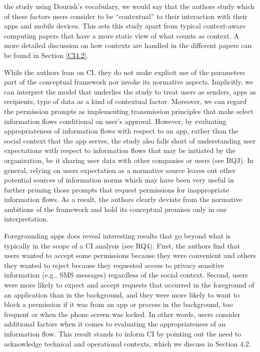 \documentclass[../thesis.tex]{subfiles}
\begin{document}
the study using Dourish's vocabulary, we would say that
the authors study which of these factors users consider to be
``contextual'' to their interaction
with their apps and mobile devices. This sets this study apart from
typical context-aware computing papers that have a more static view of
what counts as context. A more detailed discussion on how contexts are
handled in the different papers can be found in Section
\ref{CI4.2}.

While the authors lean on CI, they do not make explicit use of the
parameters part of the conceptual framework nor invoke its normative
aspects. Implicitly, we can interpret the model that underlies the
study to treat users as senders, apps as recipients, type of data as a
kind of contextual factor. Moreover, we can regard the permission
prompts as implementing transmission principles that make select
information flows conditional on user's approval.
However, by evaluating appropriateness of information flows with
respect to an app, rather than the social context that the app serves,
the study also falls short of understanding user expectations with
respect to information flows that may be initiated by the organization,
be it sharing user data with other companies or users (see RQ3). In
general, relying on users expectation as a normative source leaves out
other potential sources of information norms which may have been very
useful in further pruning those prompts that request permissions for
inappropriate information flows. As a result, the authors clearly
deviate from the normative ambitions of the framework and hold its
conceptual premises only in our interpretation.

Foregrounding apps does reveal interesting
results that go beyond what is typically in the scope of a CI analysis
(see RQ4). First, the authors find that users wanted to accept some
permissions because they were convenient and others they wanted to
reject because they requested access to privacy sensitive information
(e.g., SMS messages) regardless of the social context. Second, users
were more likely to expect and accept requests that occurred in the
foreground of an application than in the background, and they were more
likely to want to block a permission if it was from an app or process
in the background, too frequent or when the phone screen was locked. In
other words, users consider additional factors when it comes to
evaluating the appropriateness of an information flow. This result
stands to inform CI by pointing out the need to acknowledge technical
and operational contexts, which we discuss in Section 4.2.
\end{document}

